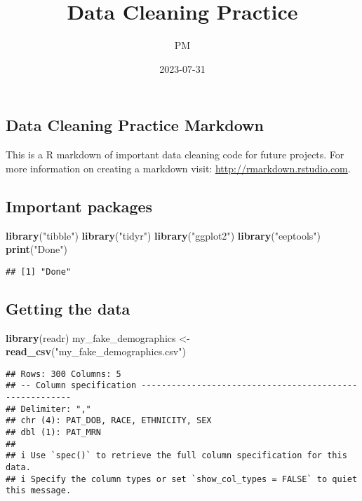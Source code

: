 \documentclass[
]{article}
\title{Data Cleaning Practice}
\author{PM}
\date{2023-07-31}
\newenvironment{Shaded}{\begin{snugshade}}{\end{snugshade}}
\newcommand{\FunctionTok}[1]{\textcolor[rgb]{0.13,0.29,0.53}{\textbf{#1}}}
\newcommand{\NormalTok}[1]{#1}
\newcommand{\OtherTok}[1]{\textcolor[rgb]{0.56,0.35,0.01}{#1}}
\newcommand{\StringTok}[1]{\textcolor[rgb]{0.31,0.60,0.02}{#1}}
\begin{document}
\maketitle

\hypertarget{data-cleaning-practice-markdown}{%
\subsection{Data Cleaning Practice
Markdown}\label{data-cleaning-practice-markdown}}

This is a R markdown of important data cleaning code for future
projects. For more information on creating a markdown visit:
\url{http://rmarkdown.rstudio.com}.

\hypertarget{important-packages}{%
\subsection{Important packages}\label{important-packages}}

\begin{Shaded}
\begin{Highlighting}[]
\FunctionTok{library}\NormalTok{(}\StringTok{"tibble"}\NormalTok{)}
\FunctionTok{library}\NormalTok{(}\StringTok{"tidyr"}\NormalTok{)}
\FunctionTok{library}\NormalTok{(}\StringTok{"ggplot2"}\NormalTok{)}
\FunctionTok{library}\NormalTok{(}\StringTok{"eeptools"}\NormalTok{)}
\FunctionTok{print}\NormalTok{(}\StringTok{"Done"}\NormalTok{)}
\end{Highlighting}
\end{Shaded}

\begin{verbatim}
## [1] "Done"
\end{verbatim}

\hypertarget{getting-the-data}{%
\subsection{Getting the data}\label{getting-the-data}}

\begin{Shaded}
\begin{Highlighting}[]
\FunctionTok{library}\NormalTok{(readr)}
\NormalTok{my\_fake\_demographics }\OtherTok{\textless{}{-}} \FunctionTok{read\_csv}\NormalTok{(}\StringTok{"my\_fake\_demographics.csv"}\NormalTok{)}
\end{Highlighting}
\end{Shaded}

\begin{verbatim}
## Rows: 300 Columns: 5
## -- Column specification --------------------------------------------------------
## Delimiter: ","
## chr (4): PAT_DOB, RACE, ETHNICITY, SEX
## dbl (1): PAT_MRN
## 
## i Use `spec()` to retrieve the full column specification for this data.
## i Specify the column types or set `show_col_types = FALSE` to quiet this message.
\end{verbatim}
\end{document}
